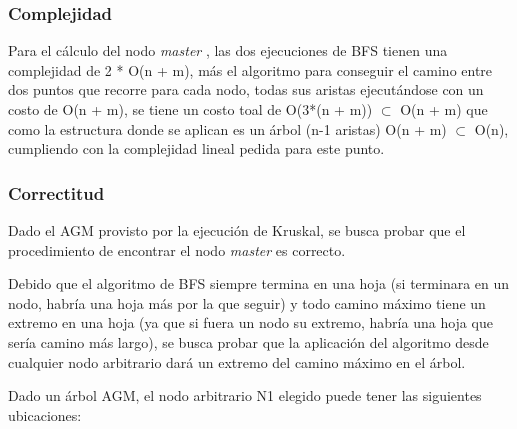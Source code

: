 \documentclass[a4paper, 10pt, twoside]{article}
\begin{document}
\subsubsection{Complejidad}

Para el cálculo del nodo \textit{master} , las dos ejecuciones de BFS tienen una complejidad de 2 * O(n + m), más el algoritmo para conseguir el camino entre dos puntos que recorre para cada nodo, todas sus aristas ejecutándose con un costo de O(n + m), se tiene un costo toal de O(3*(n + m)) $\subset$ O(n + m) que como la estructura donde se aplican es un árbol (n-1 aristas) O(n + m) $\subset$ O(n), cumpliendo con la complejidad lineal pedida para este punto.

\subsubsection{Correctitud}

Dado el AGM provisto por la ejecución de Kruskal, se busca probar que el procedimiento de encontrar el nodo \textit{master} es correcto.

Debido que el algoritmo de BFS siempre termina en una hoja (si terminara en un nodo, habría una hoja más por la que seguir) y todo camino máximo tiene un extremo en una hoja (ya que si fuera un nodo su extremo, habría una hoja que sería camino más largo), se busca probar que la aplicación del algoritmo desde cualquier nodo arbitrario dará un extremo del camino máximo en el árbol.

Dado un árbol AGM, el nodo arbitrario N1 elegido puede tener las siguientes ubicaciones:
\end{document}
